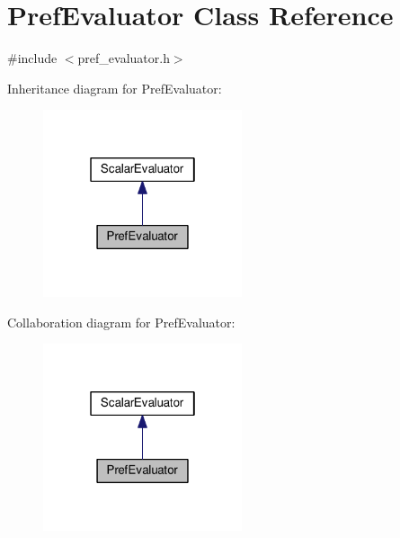 \hypertarget{classPrefEvaluator}{\section{Pref\-Evaluator Class Reference}
\label{classPrefEvaluator}
}


{\ttfamily \#include $<$pref\-\_\-evaluator.\-h$>$}



Inheritance diagram for Pref\-Evaluator\-:
\nopagebreak
\begin{figure}[H]
\begin{center}
\leavevmode
\includegraphics[width=166pt]{classPrefEvaluator__inherit__graph}
\end{center}
\end{figure}


Collaboration diagram for Pref\-Evaluator\-:
\nopagebreak
\begin{figure}[H]
\begin{center}
\leavevmode
\includegraphics[width=166pt]{classPrefEvaluator__coll__graph}
\end{center}
\end{figure}
